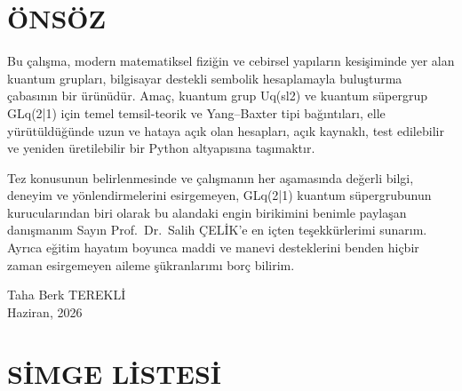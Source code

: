 \documentclass[12pt,a4paper]{report}
\numberwithin{equation}{chapter}
\renewcommand{\contentsname}{İÇİNDEKİLER}%
\theoremstyle{plain}
\theoremstyle{definition}
\newcommand{\Ogrenci}{Taha Berk TEREKLİ}
\newcommand{\Danisman}{Prof.\ Dr.\ Salih ÇELİK}
\newcommand{\TarihAy}{Haziran}
\newcommand{\TarihYil}{2026}
\begin{document}
\clearpage

\thispagestyle{empty} %
\chapter{ÖNSÖZ}

Bu çalışma, modern matematiksel fiziğin ve cebirsel yapıların kesişiminde yer alan
kuantum grupları, bilgisayar destekli sembolik hesaplamayla buluşturma çabasının
bir ürünüdür. Amaç, kuantum grup Uq(sl2) ve kuantum süpergrup GLq(2|1) için temel
temsil-teorik ve Yang--Baxter tipi bağıntıları, elle yürütüldüğünde uzun ve hataya
açık olan hesapları, açık kaynaklı, test edilebilir ve yeniden üretilebilir bir
Python altyapısına taşımaktır.

Tez konusunun belirlenmesinde ve çalışmanın her aşamasında değerli bilgi, deneyim
ve yönlendirmelerini esirgemeyen, GLq(2|1) kuantum süpergrubunun kurucularından
biri olarak bu alandaki engin birikimini benimle paylaşan danışmanım
Sayın \Danisman'e en içten teşekkürlerimi sunarım. Ayrıca eğitim hayatım boyunca
maddi ve manevi desteklerini benden hiçbir zaman esirgemeyen aileme şükranlarımı
borç bilirim.

\vspace{1.5cm}
\begin{flushright}
\Ogrenci\\
\TarihAy, \TarihYil
\end{flushright}
\clearpage

\renewcommand{\contentsname}{İÇİNDEKİLER}
\tableofcontents
\clearpage

\chapter{SİMGE LİSTESİ}
\end{document}
